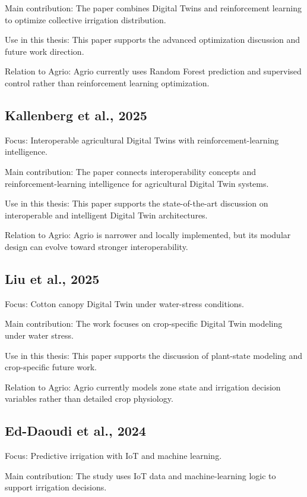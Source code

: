 Main contribution: The paper combines Digital Twins and reinforcement learning to optimize collective irrigation distribution.

Use in this thesis: This paper supports the advanced optimization discussion and future work direction.

Relation to Agrio: Agrio currently uses Random Forest prediction and supervised control rather than reinforcement learning optimization.

\subsection{Kallenberg et al., 2025}

Focus: Interoperable agricultural Digital Twins with reinforcement-learning intelligence.

Main contribution: The paper connects interoperability concepts and reinforcement-learning intelligence for agricultural Digital Twin systems.

Use in this thesis: This paper supports the state-of-the-art discussion on interoperable and intelligent Digital Twin architectures.

Relation to Agrio: Agrio is narrower and locally implemented, but its modular design can evolve toward stronger interoperability.

\subsection{Liu et al., 2025}

Focus: Cotton canopy Digital Twin under water-stress conditions.

Main contribution: The work focuses on crop-specific Digital Twin modeling under water stress.

Use in this thesis: This paper supports the discussion of plant-state modeling and crop-specific future work.

Relation to Agrio: Agrio currently models zone state and irrigation decision variables rather than detailed crop physiology.

\subsection{Ed-Daoudi et al., 2024}

Focus: Predictive irrigation with IoT and machine learning.

Main contribution: The study uses IoT data and machine-learning logic to support irrigation decisions.

